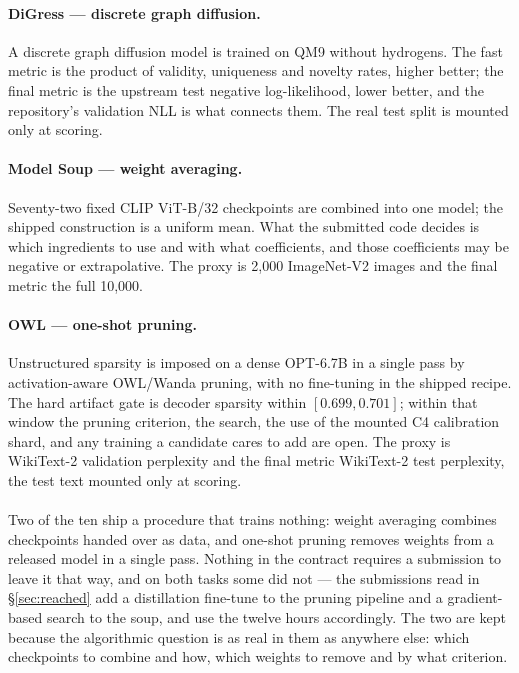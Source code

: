 \paragraph{DiGress --- discrete graph diffusion.}
A discrete graph diffusion model is trained on QM9 without hydrogens. The fast metric is the
product of validity, uniqueness and novelty rates, higher better; the final metric is the upstream
test negative log-likelihood, lower better, and the repository's validation NLL is what connects
them. The real test split is mounted only at scoring.

\paragraph{Model Soup --- weight averaging.}
Seventy-two fixed CLIP ViT-B/32 checkpoints are combined into one model; the shipped construction is
a uniform mean. What the submitted code decides is which ingredients to use and with what
coefficients, and those coefficients may be negative or extrapolative. The proxy is 2,000
ImageNet-V2 images and the final metric the full 10,000.

\paragraph{OWL --- one-shot pruning.}
Unstructured sparsity is imposed on a dense OPT-6.7B in a single pass by activation-aware OWL/Wanda
pruning, with no fine-tuning in the shipped recipe. The hard artifact gate is decoder sparsity
within $[0.699, 0.701]$; within that window the pruning criterion, the search, the use of the
mounted C4 calibration shard, and any training a candidate cares to add are open. The proxy is
WikiText-2 validation perplexity and the final metric WikiText-2 test perplexity, the test text
mounted only at scoring.

\paragraph{}
Two of the ten ship a procedure that trains nothing: weight averaging combines checkpoints handed
over as data, and one-shot pruning removes weights from a released model in a single pass. Nothing
in the contract requires a submission to leave it that way, and on both tasks some did not --- the
submissions read in \S\ref{sec:reached} add a distillation fine-tune to the pruning pipeline and a
gradient-based search to the soup, and use the twelve hours accordingly. The two are kept because
the algorithmic question is as real in them as anywhere else: which checkpoints to combine and how,
which weights to remove and by what criterion.


